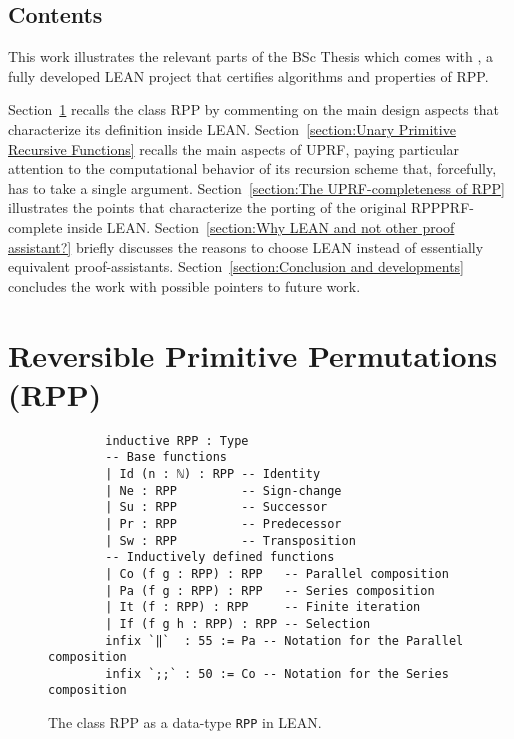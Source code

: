 \documentclass[runningheads]{llncs}
\newcommand{\RPP}{\textsf{RPP}\xspace}
\newcommand{\UPRF}{\textsf{UPRF}\xspace}
\newcommand{\PRF}{\textsf{PRF}\xspace}
\newcommand{\LEAN}{\textsf{LEAN}\xspace}
\begin{document}
\subsection{Contents}
This work illustrates the relevant parts of the BSc Thesis \cite{MalettoBSc2021} which comes with \cite{MalettoRPPLEAN2021}, a fully developed \LEAN project that certifies algorithms and properties of \RPP.

Section~\ref{section:Reversible Primitive Permutations} recalls the class \RPP by commenting on the main design aspects that characterize its definition inside \LEAN.
Section~\ref{section:Unary Primitive Recursive Functions} recalls the main aspects of \UPRF, paying particular attention to the computational behavior of its recursion scheme that, forcefully, has to take a single argument.
Section~\ref{section:The UPRF-completeness of RPP} illustrates the points that characterize the porting of the original \RPP  \PRF-complete inside \LEAN.
Section~\ref{section:Why LEAN and not other proof assistant?} briefly discusses the reasons to choose \LEAN instead of essentially equivalent proof-assistants.
Section~\ref{section:Conclusion and developments} concludes the work with possible pointers to future work.

\section{Reversible Primitive Permutations (\RPP) }
\label{section:Reversible Primitive Permutations}

\begin{figure}
    \centering
        \begin{lstlisting}
        inductive RPP : Type
        -- Base functions
        | Id (n : ℕ) : RPP -- Identity
        | Ne : RPP         -- Sign-change
        | Su : RPP         -- Successor
        | Pr : RPP         -- Predecessor
        | Sw : RPP         -- Transposition
        -- Inductively defined functions
        | Co (f g : RPP) : RPP   -- Parallel composition
        | Pa (f g : RPP) : RPP   -- Series composition
        | It (f : RPP) : RPP     -- Finite iteration
        | If (f g h : RPP) : RPP -- Selection
        infix `‖`  : 55 := Pa -- Notation for the Parallel composition
        infix `;;` : 50 := Co -- Notation for the Series composition
        \end{lstlisting}
    \caption{The class \RPP as a data-type \lstinline|RPP| in \LEAN.}
    \label{fig:RPP-LEAN}
\end{figure}
\end{document}
